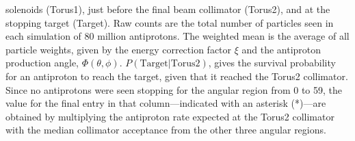 {\begin{table}[p]
{solenoids (Torus1), just before the final beam collimator (Torus2), and at the
stopping target (Target).
Raw counts are the total number of particles seen in each simulation of 80
million antiprotons. The weighted mean is the average of all particle
weights, given by the energy correction factor $\xi$
and the antiproton production angle, $\Phi(\theta,\phi)$.
$P(\textrm{Target}|\textrm{Torus2})$, gives the survival
probability for an antiproton to reach the target, given that it reached the Torus2 collimator.
Since no antiprotons were seen stopping for the angular region from 0 to
59\degree, the value for the final entry in that column---indicated
with an asterisk (*)---are obtained by multiplying the antiproton rate
expected at the Torus2 collimator with the median collimator acceptance from
the other three angular regions.%
}
\end{table}\xspace}


